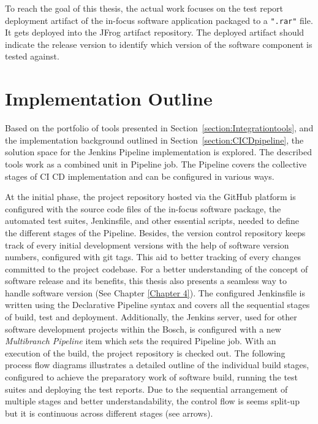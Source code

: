 \vspace{0.5cm}
\lstset{style=mystyle}

\vspace{0.5cm}



To reach the goal of this thesis, the actual work focuses on the test report deployment artifact of the in-focus software application packaged to a \texttt{".rar"} file. It gets deployed into the JFrog artifact repository. The deployed artifact should indicate the release version to identify which version of the software component is tested against.


\section{Implementation Outline}\label{section:ImplementationOutline}

Based on the portfolio of tools presented in Section~\ref{section:Integrationtools}, and the implementation background outlined in Section~\ref{section:CICDpipeline}, the solution space for the Jenkins Pipeline implementation is explored. The described tools work as a combined unit in Pipeline job. The Pipeline covers the collective stages of \ac{CI} \ac{CD} implementation and can be configured in various ways.


At the initial phase, the project repository hosted via the GitHub platform is configured with the source code files of the in-focus software package, the automated test suites, Jenkinsfile, and other essential scripts, needed to define the different stages of the Pipeline. Besides, the version control repository keeps track of every initial development versions with the help of software version numbers, configured with git tags. This aid to better tracking of every changes committed to the project codebase. For a better understanding of the concept of software release and its benefits, this thesis also presents a seamless way to handle software version (See Chapter \ref{Chapter 4}). The configured Jenkinsfile is written using the Declarative Pipeline syntax and covers all the sequential stages of build, test and deployment. Additionally, the Jenkins server, used for other software development projects within the Bosch, is configured with a new \emph{Multibranch Pipeline} item which sets the required Pipeline job. With an execution of the build, the project repository is checked out. The following process flow diagrams illustrates a detailed outline of the individual build stages, configured to achieve the preparatory work of software build, running the test suites and deploying the test reports. Due to the sequential arrangement of multiple stages and better understandability, the control flow is seems split-up but it is continuous across different stages (see arrows).


